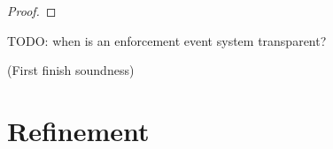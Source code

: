 \begin{proof}
            

            

            
            
        
\end{proof}


\begin{definition}
    \label{def:enforcement-event-system-transparency}
    TODO: when is an enforcement event system transparent?

    (First finish soundness)
\end{definition}

\section{Refinement}
\label{section:refinement}


